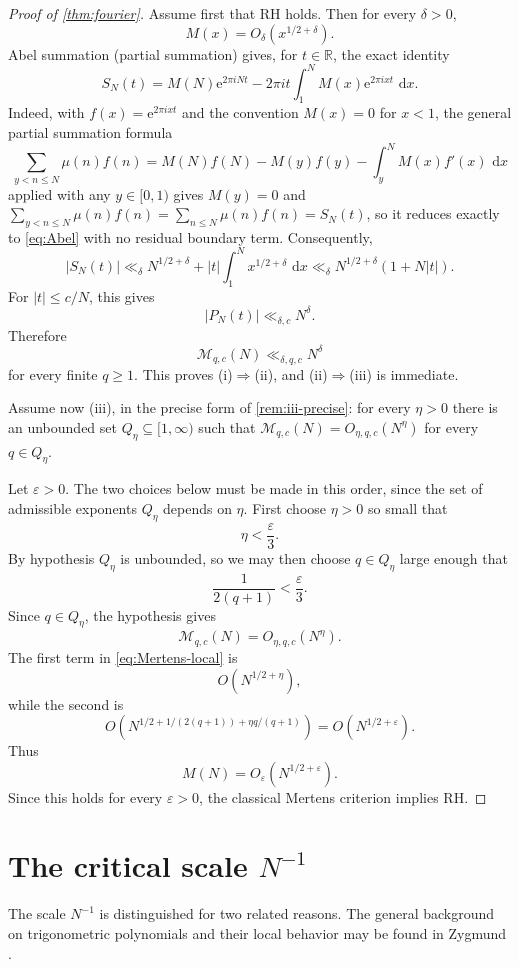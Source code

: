 \documentclass[11pt]{article}
\theoremstyle{remark}
\newcommand{\e}{\mathrm e}
\newcommand{\dd}{\,\mathrm d}
\newcommand{\Mcal}{\mathcal M}
\begin{document}
\begin{proof}[Proof of \cref{thm:fourier}]
Assume first that RH holds.  Then for every \(\delta>0\),
\[
 M(x)=O_\delta(x^{1/2+\delta}).
\]
Abel summation (partial summation) gives, for \(t\in\mathbb R\), the
exact identity
\begin{equation}\label{eq:Abel}
 S_N(t)
 =
 M(N)\e^{2\pi iNt}
 -
 2\pi it\int_1^N M(x)\e^{2\pi ixt}\,\dd x.
\end{equation}
Indeed, with \(f(x)=\e^{2\pi ixt}\) and the convention \(M(x)=0\) for
\(x<1\), the general partial summation formula
\[
 \sum_{y<n\leq N}\mu(n)f(n)
 =
 M(N)f(N)-M(y)f(y)-\int_y^N M(x)f'(x)\,\dd x
\]
applied with any \(y\in[0,1)\) gives \(M(y)=0\) and
\(\sum_{y<n\leq N}\mu(n)f(n)=\sum_{n\leq N}\mu(n)f(n)=S_N(t)\), so it
reduces exactly to \eqref{eq:Abel} with no residual boundary term.
Consequently,
\[
 |S_N(t)|
 \ll_\delta
 N^{1/2+\delta}
 +
 |t|\int_1^N x^{1/2+\delta}\,\dd x
 \ll_\delta
 N^{1/2+\delta}(1+N|t|).
\]
For \(|t|\leq c/N\), this gives
\[
 |P_N(t)|\ll_{\delta,c}N^\delta.
\]
Therefore
\[
 \Mcal_{q,c}(N)\ll_{\delta,q,c}N^\delta
\]
for every finite \(q\geq1\).  This proves
\textup{(i)}\(\Rightarrow\)\textup{(ii)}, and
\textup{(ii)}\(\Rightarrow\)\textup{(iii)} is immediate.

Assume now \textup{(iii)}, in the precise form of \cref{rem:iii-precise}:
for every \(\eta>0\) there is an unbounded set \(Q_\eta\subseteq[1,\infty)\)
such that \(\Mcal_{q,c}(N)=O_{\eta,q,c}(N^\eta)\) for every
\(q\in Q_\eta\).

Let \(\varepsilon>0\).  The two choices below must be made in this
order, since the set of admissible exponents \(Q_\eta\) depends on
\(\eta\).  First choose \(\eta>0\) so small that
\[
 \eta<\frac{\varepsilon}{3}.
\]
By hypothesis \(Q_\eta\) is unbounded, so we may then choose
\(q\in Q_\eta\) large enough that
\[
 \frac1{2(q+1)}<\frac{\varepsilon}{3}.
\]
Since \(q\in Q_\eta\), the hypothesis gives
\[
 \Mcal_{q,c}(N)=O_{\eta,q,c}(N^\eta).
\]
The first term in \eqref{eq:Mertens-local} is
\[
 O(N^{1/2+\eta}),
\]
while the second is
\[
 O\left(
 N^{1/2+1/(2(q+1))+\eta q/(q+1)}
 \right)
 =
 O(N^{1/2+\varepsilon}).
\]
Thus
\[
 M(N)=O_\varepsilon(N^{1/2+\varepsilon}).
\]
Since this holds for every \(\varepsilon>0\), the classical Mertens
criterion implies RH.
\end{proof}

\section{The critical scale \texorpdfstring{\(N^{-1}\)}{N to the minus one}}
The scale \(N^{-1}\) is distinguished for two related reasons.
The general background on trigonometric polynomials and their local
behavior may be found in Zygmund \cite{Zygmund}.
\end{document}
